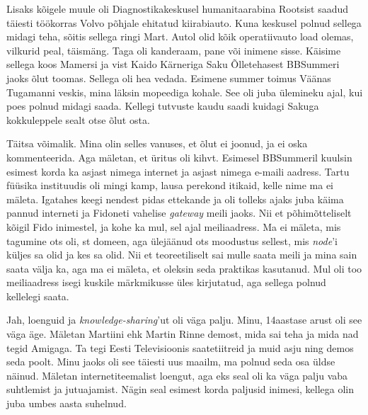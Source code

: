 Lisaks kõigele muule oli Diagnostikakeskusel humanitaarabina Rootsist saadud täiesti töökorras Volvo 
põhjale ehitatud kiirabiauto. Kuna keskusel polnud sellega 
midagi teha, sõitis sellega ringi Mart. Autol olid kõik 
operatiivauto load olemas, vilkurid peal, täismäng. Taga oli kanderaam, 
pane või inimene sisse. Käisime sellega koos
Mamersi ja vist Kaido Kärneriga Saku Õlletehasest BBSummeri jaoks õlut toomas. Sellega oli hea vedada. Esimene summer toimus Väänas Tugamanni veskis, mina läksin 
mopeediga kohale. See oli juba ülemineku ajal, 
kui poes polnud midagi saada. Kellegi tutvuste kaudu saadi kuidagi
Sakuga kokkuleppele sealt otse õlut osta. 


Täitsa võimalik. Mina olin selles vanuses, et õlut ei joonud, ja ei oska kommenteerida. Aga mäletan, et üritus oli kihvt.
Esimesel BBSummeril kuulsin esimest korda ka
asjast nimega internet ja asjast nimega e-maili aadress. Tartu füüsika 
instituudis oli mingi kamp, lausa 
perekond itikaid, kelle nime ma ei mäleta. Igatahes keegi 
nendest pidas ettekande ja oli tolleks ajaks juba käima pannud interneti ja 
Fidoneti vahelise \emph{gateway} meili jaoks. Nii et põhimõtteliselt kõigil 
Fido inimestel, ja kohe ka mul, sel ajal 
meiliaadress. Ma ei mäleta, mis tagumine ots oli, st domeen, aga 
ülejäänud ots moodustus sellest, mis \emph{node}'i küljes sa olid ja kes sa olid. Nii et teoreetiliselt sai mulle saata meili ja mina sain saata välja ka, 
aga ma ei mäleta, et oleksin seda praktikas kasutanud. Mul oli 
too meiliaadress isegi kuskile märkmikusse üles kirjutatud, aga sellega 
polnud kellelegi saata. 


Jah, loenguid ja \emph{knowledge-sharing}'ut oli väga palju. Minu, 
14aastase arust oli see väga äge. Mäletan Martiini ehk Martin Rinne demost, mida sai teha ja 
mida nad tegid Amigaga. Ta tegi Eesti Televisioonis saatetiitreid ja muid asju ning demos seda poolt. Minu jaoks oli see täiesti uus maailm, ma polnud 
seda osa üldse näinud. Mäletan internetiteemalist loengut, aga 
eks seal oli ka väga palju vaba suhtlemist ja jutuajamist. Nägin seal
esimest korda paljusid inimesi, kellega olin juba umbes aasta suhelnud. 

